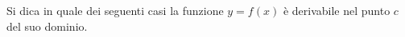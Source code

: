 Si dica in quale dei seguenti casi la funzione $y=f(x)$ è derivabile nel 
punto $c$ del suo 
dominio.